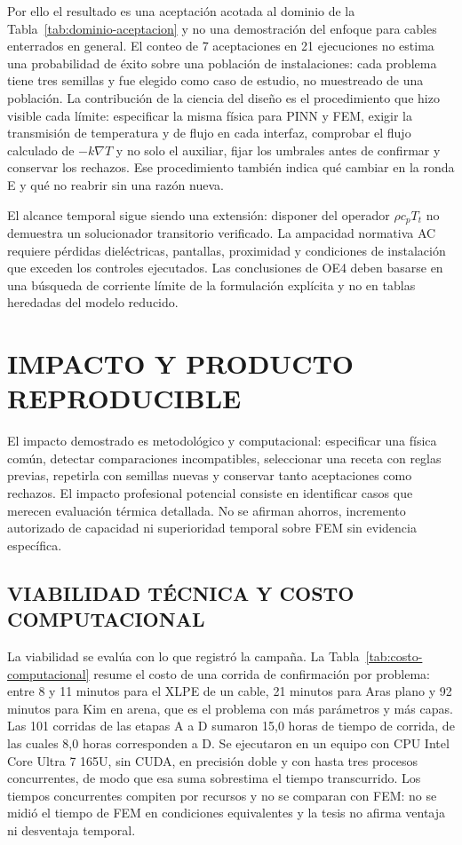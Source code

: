 Por ello el resultado es una aceptación acotada al dominio de la Tabla~\ref{tab:dominio-aceptacion} y no una demostración del enfoque para cables enterrados en general. El conteo de 7 aceptaciones en 21 ejecuciones no estima una probabilidad de éxito sobre una población de instalaciones: cada problema tiene tres semillas y fue elegido como caso de estudio, no muestreado de una población. La contribución de la ciencia del diseño es el procedimiento que hizo visible cada límite: especificar la misma física para PINN y FEM, exigir la transmisión de temperatura y de flujo en cada interfaz, comprobar el flujo calculado de $-k\nabla T$ y no solo el auxiliar, fijar los umbrales antes de confirmar y conservar los rechazos. Ese procedimiento también indica qué cambiar en la ronda E y qué no reabrir sin una razón nueva.

El alcance temporal sigue siendo una extensión: disponer del operador $\rho c_pT_t$ no demuestra un solucionador transitorio verificado. La ampacidad normativa AC requiere pérdidas dieléctricas, pantallas, proximidad y condiciones de instalación que exceden los controles ejecutados. Las conclusiones de OE4 deben basarse en una búsqueda de corriente límite de la formulación explícita y no en tablas heredadas del modelo reducido.

\section{IMPACTO Y PRODUCTO REPRODUCIBLE}
\label{sec:impacto}

El impacto demostrado es metodológico y computacional: especificar una física común, detectar comparaciones incompatibles, seleccionar una receta con reglas previas, repetirla con semillas nuevas y conservar tanto aceptaciones como rechazos. El impacto profesional potencial consiste en identificar casos que merecen evaluación térmica detallada. No se afirman ahorros, incremento autorizado de capacidad ni superioridad temporal sobre FEM sin evidencia específica.

\subsection{VIABILIDAD TÉCNICA Y COSTO COMPUTACIONAL}

La viabilidad se evalúa con lo que registró la campaña. La Tabla~\ref{tab:costo-computacional} resume el costo de una corrida de confirmación por problema: entre 8 y 11 minutos para el XLPE de un cable, 21 minutos para Aras plano y 92 minutos para Kim en arena, que es el problema con más parámetros y más capas. Las 101 corridas de las etapas A a D sumaron 15,0 horas de tiempo de corrida, de las cuales 8,0 horas corresponden a D. Se ejecutaron en un equipo con CPU Intel Core Ultra 7 165U, sin CUDA, en precisión doble y con hasta tres procesos concurrentes, de modo que esa suma sobrestima el tiempo transcurrido. Los tiempos concurrentes compiten por recursos y no se comparan con FEM: no se midió el tiempo de FEM en condiciones equivalentes y la tesis no afirma ventaja ni desventaja temporal.

